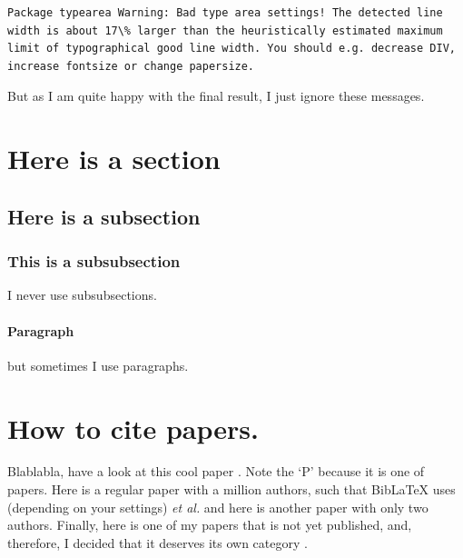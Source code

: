 \begin{lstlisting}
Package typearea Warning: Bad type area settings! The detected line width is about 17\% larger than the heuristically estimated maximum limit of typographical good line width. You should e.g. decrease DIV, increase fontsize or change papersize.
\end{lstlisting}

But as I am quite happy with the final result, I just ignore these messages.



\blindtext
\section{Here is a section}
\blindtext
\subsection{Here is a subsection}
\blindtext
\subsubsection{This is a subsubsection}
I never use subsubsections.
\paragraph{Paragraph} but sometimes I use paragraphs.
\section{How to cite papers.}
Blablabla, have a look at this cool paper \cite{berke_transmon_2022}. Note the `P' because it is one of  papers. Here is a regular paper \cite{aruteQuantumSupremacyUsing2019a} with a million authors, such that BibLaTeX uses (depending on your settings) \textit{et al.} and here is another paper \cite{magesan_effective_2020} with only two authors. Finally, here is one of my papers that is not yet published, and, therefore, I decided that it deserves its own category \cite{inpreparation}.

